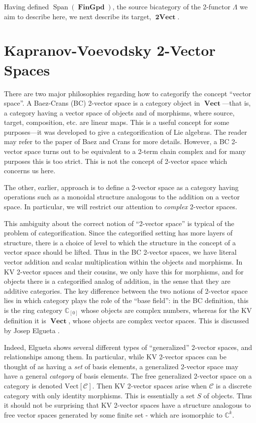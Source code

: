 \documentclass[10pt]{amsart}
\numberwithin{theorem}{subsection}
\newcommand{\opname}[1]{\operatorname{#1}}
\newcommand{\catname}[1]{\boldsymbol{\opname{{#1}}}}
\newcommand{\Span}{\opname{Span}}
\newcommand{\V}{\catname{Vect}}
\newcommand{\iiV}{\catname{2Vect}}
\newcommand{\Gpd}{\catname{FinGpd}}
\newcommand{\FV}{\Lambda}
\begin{document}
Having defined $\Span(\Gpd)$, the source bicategory of the 2-functor $\FV$ we aim to describe here, we next describe its target, $\iiV$. 

\section{Kapranov-Voevodsky 2-Vector Spaces}\label{sec:KV}

There are two major philosophies regarding how to categorify the
concept ``vector space''.  A Baez-Crans (BC) 2-vector space is a
category object in $\V$---that is, a category having a vector space of
objects and of morphisms, where source, target, composition, etc. are
linear maps.  This is a useful concept for some purposes---it was
developed to give a categorification of Lie algebras.  The reader may
refer to the paper of Baez and Crans \cite{BC} for more details.
However, a BC 2-vector space turns out to be equivalent to a 2-term
chain complex and for many purposes this is too strict.  This is not
the concept of 2-vector space which concerns us here.

The other, earlier, approach is to define a 2-vector space as a
category having operations such as a monoidal structure analogous to
the addition on a vector space.  In particular, we will restrict our
attention to \textit{complex} 2-vector spaces.

This ambiguity about the correct notion of ``2-vector space'' is
typical of the problem of categorification.  Since the categorified
setting has more layers of structure, there is a choice of level to
which the structure in the concept of a vector space should be lifted.
Thus in the BC 2-vector spaces, we have literal vector addition and
scalar multiplication within the objects and morphisms.  In KV
2-vector spaces and their cousins, we only have this for morphisms,
and for objects there is a categorified analog of addition, in the
sense that they are additive categories.  The key difference between
the two notions of 2-vector space lies in which category plays the
role of the ``base field'': in the BC definition, this is the ring
category $\mathbb{C}_{[0]}$ whose objects are complex numbers, whereas
for the KV definition it is $\V$, whose objects are complex vector
spaces.  This is discussed by Josep Elgueta \cite{elgueta}.

Indeed, Elgueta \cite{elgueta} shows several different types of
``generalized'' 2-vector spaces, and relationships among them.  In
particular, while KV 2-vector spaces can be thought of as having a
\textit{set} of basis elements, a generalized 2-vector space may have
a general \textit{category} of basis elements.  The free generalized
2-vector space on a category is denoted $\catname{Vect[\mathcal{C}]}$.
Then KV 2-vector spaces arise when $\mathcal{C}$ is a discrete
category with only identity morphisms.  This is essentially a set $S$
of objects.  Thus it should not be surprising that KV 2-vector spaces
have a structure analogous to free vector spaces generated by some
finite set - which are isomorphic to $\mathbb{C}^k$.
\end{document}
